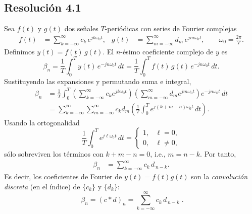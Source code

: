 \documentclass[
  11pt,
  letterpaper,
   addpoints,
   answers
  ]{exam}
\begin{document}
\begin{questions}
\begin{solution}
\subsection*{Resolución 4.1}
Sea \(f(t)\) y \(g(t)\) dos señales \(T\)-periódicas con series de Fourier complejas
\begin{align}
f(t) &= \sum_{k=-\infty}^{\infty} c_k\,e^{jk\omega_0 t}, &
g(t) &= \sum_{m=-\infty}^{\infty} d_m\,e^{jm\omega_0 t}, \qquad \omega_0=\frac{2\pi}{T}.
\end{align}
Definimos \(y(t)=f(t)\,g(t)\). El \(n\)-ésimo coeficiente complejo de \(y\) es
\begin{equation}
\beta_n=\frac{1}{T}\int_{0}^{T} y(t)\,e^{-jn\omega_0 t}\,dt
= \frac{1}{T}\int_{0}^{T} f(t)\,g(t)\,e^{-jn\omega_0 t}\,dt .
\end{equation}
Sustituyendo las expansiones y permutando suma e integral,
\begin{align}
\beta_n
&= \frac{1}{T}\int_{0}^{T} 
\left(\sum_{k=-\infty}^{\infty} c_k e^{jk\omega_0 t}\right)
\left(\sum_{m=-\infty}^{\infty} d_m e^{jm\omega_0 t}\right)
e^{-jn\omega_0 t}\,dt \\
&= \sum_{k=-\infty}^{\infty}\sum_{m=-\infty}^{\infty} 
c_k d_m \left(\frac{1}{T}\int_{0}^{T} e^{j(k+m-n)\omega_0 t}\,dt\right).
\end{align}
Usando la ortogonalidad
\begin{equation}
\frac{1}{T}\int_{0}^{T} e^{j\ell\omega_0 t}\,dt
=\begin{cases}
1, & \ell=0,\\
0, & \ell\neq 0,
\end{cases}
\end{equation}
sólo sobreviven los términos con \(k+m-n=0\), i.e., \(m=n-k\). Por tanto,
\begin{align}
\beta_n
&= \sum_{k=-\infty}^{\infty} c_k\, d_{\,n-k}.
\end{align}
Es decir, los coeficientes de Fourier de \(y(t)=f(t)g(t)\) son la \emph{convolución discreta} (en el índice) de \(\{c_k\}\) y \(\{d_k\}\):
\begin{equation}
\boxed{\;\beta_n=(c*d)_n=\displaystyle\sum_{k=-\infty}^{\infty} c_k\,d_{\,n-k}\;}.
\end{equation}

\end{solution}

\end{questions}
\end{document}
